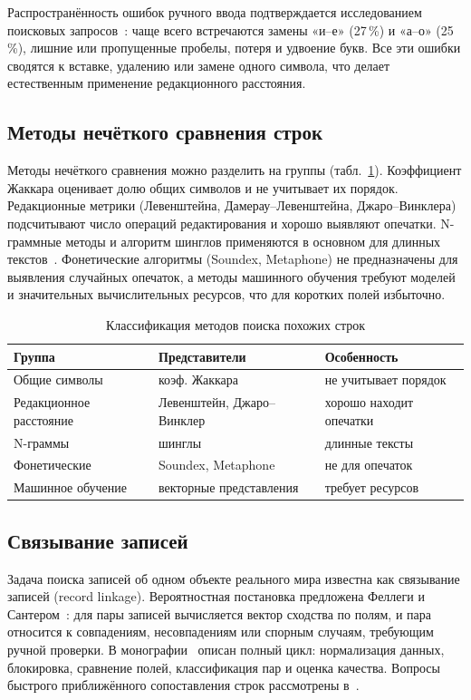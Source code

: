 \documentclass{misisarticle}
\begin{document}
Распространённость ошибок ручного ввода подтверждается исследованием поисковых запросов~\cite{yandex}: чаще всего встречаются замены «и--е» (27\,\%) и «а--о» (25\,\%), лишние или пропущенные пробелы, потеря и удвоение букв. Все эти ошибки сводятся к вставке, удалению или замене одного символа, что делает естественным применение редакционного расстояния.

\subsection{Методы нечёткого сравнения строк}

Методы нечёткого сравнения можно разделить на группы (табл.~\ref{tab:methods}). Коэффициент Жаккара оценивает долю общих символов и не учитывает их порядок. Редакционные метрики (Левенштейна, Дамерау--Левенштейна, Джаро--Винклера) подсчитывают число операций редактирования и хорошо выявляют опечатки. N-граммные методы и алгоритм шинглов применяются в основном для длинных текстов~\cite{williams2013, zhang2010}. Фонетические алгоритмы (Soundex, Metaphone) не предназначены для выявления случайных опечаток, а методы машинного обучения требуют моделей и значительных вычислительных ресурсов, что для коротких полей избыточно.

\begin{table}[htbp]
\caption{Классификация методов поиска похожих строк}
\label{tab:methods}
\centering
\small
\begin{tabular}{p{2.4cm}p{2.6cm}p{2.5cm}}
\toprule
\textbf{Группа} & \textbf{Представители} & \textbf{Особенность} \\
\toprule
Общие символы & коэф. Жаккара & не учитывает порядок \\
Редакционное расстояние & Левенштейн, Джаро--Винклер & хорошо находит опечатки \\
N-граммы & шинглы & длинные тексты \\
Фонетические & Soundex, Metaphone & не для опечаток \\
Машинное обучение & векторные представления & требует ресурсов \\
\bottomrule
\end{tabular}
\end{table}

\subsection{Связывание записей}

Задача поиска записей об одном объекте реального мира известна как связывание записей (record linkage). Вероятностная постановка предложена Феллеги и Сантером~\cite{fellegi1969}: для пары записей вычисляется вектор сходства по полям, и пара относится к совпадениям, несовпадениям или спорным случаям, требующим ручной проверки. В монографии~\cite{christen2012} описан полный цикл: нормализация данных, блокировка, сравнение полей, классификация пар и оценка качества. Вопросы быстрого приближённого сопоставления строк рассмотрены в~\cite{baeza1999}.
\end{document}
